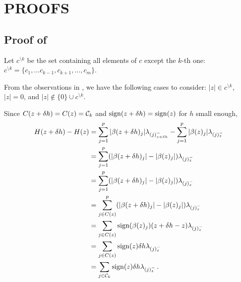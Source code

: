 \section{PROOFS}
\label{sec:proofs}

\subsection{Proof of }
\label{app:proof_directional_derivative}

Let \(c^{\setminus k}\) be the set containing all elements of $c$ except the $k$-th one: $c^{\setminus k} =  \{c_1, \ldots c_{k-1}, c_{k+1}, \ldots, c_m \}$.

From the observations in ,
we have the following cases to consider: \(|z| \in c^{\setminus k}\),
\(|z| = 0\), and \(|z| \notin \{0\} \cup c^{\setminus k}\).


Since \(C(z + \delta h) = C(z) = \mathcal{C}_k\) and $\operatorname{sign}(z + \delta h) = \operatorname{sign}(z)$ for $h$ small enough,
\begin{align}
	H(z + \delta h) - H(z)
	 & = \sum_{j =1}^p |\beta(z + \delta h)_j| \lambda_{(j)^-_{z + \delta h}}
	- \sum_{j=1}^p |\beta(z)_j| \lambda_{(j)^-_z} \nonumber                                       \\
	 & = \sum_{j =1}^p (|\beta(z + \delta h)_j| - |\beta(z)_j|) \lambda_{(j)^-_z} \nonumber       \\
	 & = \sum_{j =1}^p (|\beta(z + \delta h)_j| - |\beta(z)_j|) \lambda_{(j)^-_z} \nonumber       \\
	 & = \sum_{j \in C(z)}^p (|\beta(z + \delta h)_j| - |\beta(z)_j|) \lambda_{(j)^-_z} \nonumber \\
	 & = \sum_{j \in C(z)} \operatorname{sign}(\beta(z)_j) (z + \delta h - z) \lambda_{(j)^-_z} \nonumber       \\
	 & = \sum_{j \in C(z)} \operatorname{sign}(z) \delta h  \lambda_{(j)^-_z} \nonumber                         \\
	 & = \sum_{j \in \mathcal{C}_k} \operatorname{sign}(z) \delta h  \lambda_{(j)^-_z} \, .
\end{align}

